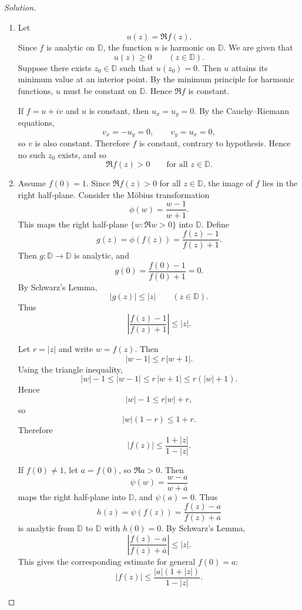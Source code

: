 \documentclass[12pt, a4paper]{report}
\theoremstyle{spaced}
\begin{document}
\begin{proof}[Solution]
	\begin{enumerate}[label=(\alph*)]
		\item Let
		      \[
			      u(z)=\Re f(z).
		      \]
		      Since \(f\) is analytic on \(\mathbb D\), the function \(u\) is harmonic on \(\mathbb D\). We are given that
		      \[
			      u(z)\ge 0 \qquad (z\in\mathbb D).
		      \]
		      Suppose there exists \(z_0\in\mathbb D\) such that \(u(z_0)=0\). Then \(u\) attains its minimum value at an interior point. By the minimum principle for harmonic functions, \(u\) must be constant on \(\mathbb D\). Hence \(\Re f\) is constant.

		      If \(f=u+iv\) and \(u\) is constant, then \(u_x=u_y=0\). By the Cauchy--Riemann equations,
		      \[
			      v_x=-u_y=0,\qquad v_y=u_x=0,
		      \]
		      so \(v\) is also constant. Therefore \(f\) is constant, contrary to hypothesis. Hence no such \(z_0\) exists, and so
		      \[
			      \Re f(z)>0 \qquad \text{for all } z\in\mathbb D.
		      \]

		\item Assume \(f(0)=1\). Since \(\Re f(z)>0\) for all \(z\in\mathbb D\), the image of \(f\) lies in the right half-plane. Consider the M\"obius transformation
		      \[
			      \phi(w)=\frac{w-1}{w+1}.
		      \]
		      This maps the right half-plane \(\{w:\Re w>0\}\) into \(\mathbb D\). Define
		      \[
			      g(z)=\phi(f(z))=\frac{f(z)-1}{f(z)+1}.
		      \]
		      Then \(g:\mathbb D\to\mathbb D\) is analytic, and
		      \[
			      g(0)=\frac{f(0)-1}{f(0)+1}=0.
		      \]
		      By Schwarz's Lemma,
		      \[
			      |g(z)|\le |z| \qquad (z\in\mathbb D).
		      \]
		      Thus
		      \[
			      \left|\frac{f(z)-1}{f(z)+1}\right|\le |z|.
		      \]

		      Let \(r=|z|\) and write \(w=f(z)\). Then
		      \[
			      |w-1|\le r\,|w+1|.
		      \]
		      Using the triangle inequality,
		      \[
			      |w|-1\le |w-1|\le r\,|w+1|\le r(|w|+1).
		      \]
		      Hence
		      \[
			      |w|-1\le r|w|+r,
		      \]
		      so
		      \[
			      |w|(1-r)\le 1+r.
		      \]
		      Therefore
		      \[
			      |f(z)|\le \frac{1+|z|}{1-|z|}.
		      \]

		      If \(f(0)\ne 1\), let \(a=f(0)\), so \(\Re a>0\). Then
		      \[
			      \psi(w)=\frac{w-a}{w+\overline a}
		      \]
		      maps the right half-plane into \(\mathbb D\), and \(\psi(a)=0\). Thus
		      \[
			      h(z)=\psi(f(z))=\frac{f(z)-a}{f(z)+\overline a}
		      \]
		      is analytic from \(\mathbb D\) to \(\mathbb D\) with \(h(0)=0\). By Schwarz's Lemma,
		      \[
			      \left|\frac{f(z)-a}{f(z)+\overline a}\right|\le |z|.
		      \]
		      This gives the corresponding estimate for general \(f(0)=a\):
		      \[
			      |f(z)|\le \frac{|a|(1+|z|)}{1-|z|}.
		      \]


\end{enumerate}
\end{proof}
\end{document}
